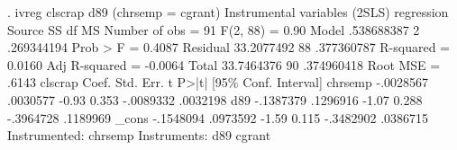 . ivreg clscrap d89 (chrsemp = cgrant)
{\smallskip}
Instrumental variables (2SLS) regression
{\smallskip}
      Source {\VBAR}       SS           df       MS      Number of obs   =        91
   F(2, 88)        =      0.90
       Model {\VBAR}  .538688387         2  .269344194   Prob > F        =    0.4087
    Residual {\VBAR}  33.2077492        88  .377360787   R-squared       =    0.0160
   Adj R-squared   =   -0.0064
       Total {\VBAR}  33.7464376        90  .374960418   Root MSE        =     .6143
{\smallskip}
     clscrap {\VBAR}      Coef.   Std. Err.      t    P>|t|     [95\% Conf. Interval]
     chrsemp {\VBAR}  -.0028567   .0030577    -0.93   0.353    -.0089332    .0032198
         d89 {\VBAR}  -.1387379   .1296916    -1.07   0.288    -.3964728    .1189969
       _cons {\VBAR}  -.1548094   .0973592    -1.59   0.115    -.3482902    .0386715
Instrumented:  chrsemp
Instruments:   d89 cgrant
{\smallskip}

